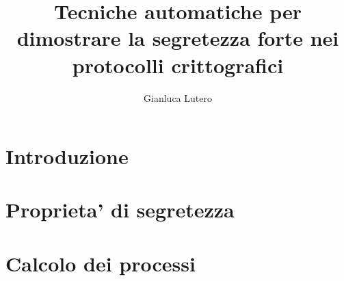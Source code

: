 \documentclass[12pt]{report}
\title{Tecniche automatiche per dimostrare la segretezza forte nei protocolli crittografici}
\author{Gianluca Lutero}
\begin{document}
\maketitle
\newpage
\tableofcontents

\newpage
{}
\section*{Introduzione}
\section*{Proprieta' di segretezza}
\section*{Calcolo dei processi}
\end{document}
